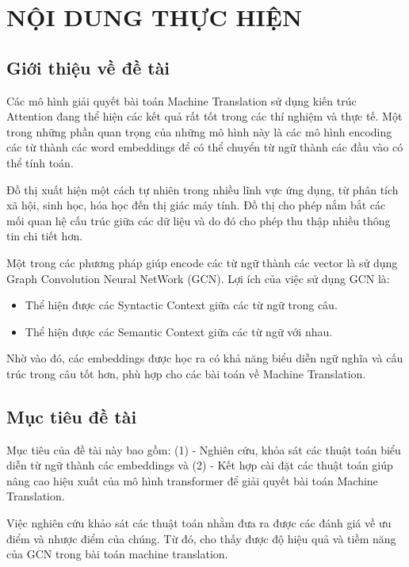 \documentclass{article}[14pt]
\begin{document}
    \section{NỘI DUNG THỰC HIỆN}
    {

    
    \subsection{Giới thiệu về đề tài}
    
    Các mô hình giải quyết bài toán Machine Translation sử dụng kiến trúc Attention đang thể hiện các kết quả rất tốt trong các thí nghiệm và thực tế. Một trong những phần quan trọng của những mô hình này là các mô hình encoding các từ thành các word embeddings để có thể chuyển từ ngữ thành các đầu vào có thể tính toán.

    Đồ thị xuất hiện một cách tự nhiên trong nhiều lĩnh vực ứng dụng, từ phân tích xã hội, sinh học, hóa học đến thị giác máy tính. Đồ thị cho phép nắm bắt các mối quan hệ cấu trúc giữa các dữ liệu và do đó cho phép thu thập nhiều thông tin chi tiết hơn.

    Một trong các phương pháp giúp encode các từ ngữ thành các vector là sử dụng Graph Convolution Neural NetWork (GCN). Lợi ích của việc sử dụng GCN là: 
    \begin{itemize}
        \item Thể hiện được các Syntactic Context giữa các từ ngữ trong câu.
        \item Thể hiện được các Semantic Context giữa các từ ngữ với nhau.
    \end{itemize}
    Nhờ vào đó, các embeddings được học ra có khả năng biểu diễn ngữ nghĩa và cấu trúc trong câu tốt hơn, phù hợp cho các bài toán về Machine Translation.
   
    \subsection{Mục tiêu đề tài}
    
    Mục tiêu của đề tài này bao gồm: (1) - Nghiên cứu, khỏa sát các thuật toán biểu diễn từ ngữ thành các embeddings và (2) - Kết hợp cài đặt các thuật toán giúp nâng cao hiệu xuất của mô hình transformer để giải quyết bài toán Machine Translation.

    Việc nghiên cứu khảo sát các thuật toán nhằm đưa ra được các đánh giá về ưu điểm và nhược điểm của chúng. Từ đó, cho thấy được độ hiệu quả và tiềm năng của GCN trong bài toán machine translation.

}
\end{document}

